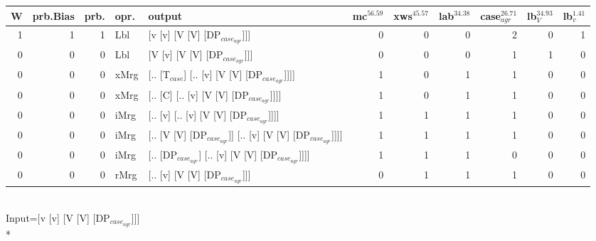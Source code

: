 \begin{tabularx}{\linewidth}{rrrlXrrrrrr}
\hline
   W &   prb.Bias &   prb. & opr.   & output                                                    &   mc$^{56.59}$ &   xws$^{45.57}$ &   lab$^{34.38}$ &   case$_{agr}^{26.71}$ &   lb$_{V}^{34.93}$ &   lb$_{v}^{1.41}$ \\
\hline
   1 &       1 &   1 & Lbl  & [v [v] [V [V] [DP$_{case_{agr}}$]]]                             &            0 &             0 &             0 &                  2 &              0 &             1 \\
   0 &       0 &   0 & Lbl  & [V [v] [V [V] [DP$_{case_{agr}}$]]]                             &            0 &             0 &             0 &                  1 &              1 &             0 \\
   0 &       0 &   0 & xMrg & [.. [T$_{case}$] [.. [v] [V [V] [DP$_{case_{agr}}$]]]]              &            1 &             0 &             1 &                  1 &              0 &             0 \\
   0 &       0 &   0 & xMrg & [.. [C] [.. [v] [V [V] [DP$_{case_{agr}}$]]]]                   &            1 &             0 &             1 &                  1 &              0 &             0 \\
   0 &       0 &   0 & iMrg & [.. [v] [.. [v] [V [V] [DP$_{case_{agr}}$]]]]                   &            1 &             1 &             1 &                  1 &              0 &             0 \\
   0 &       0 &   0 & iMrg & [.. [V [V] [DP$_{case_{agr}}$]] [.. [v] [V [V] [DP$_{case_{agr}}$]]]] &            1 &             1 &             1 &                  1 &              0 &             0 \\
   0 &       0 &   0 & iMrg & [.. [DP$_{case_{agr}}$] [.. [v] [V [V] [DP$_{case_{agr}}$]]]]         &            1 &             1 &             1 &                  0 &              0 &             0 \\
   0 &       0 &   0 & rMrg & [.. [v] [V [V] [DP$_{case_{agr}}$]]]                            &            0 &             1 &             1 &                  1 &              0 &             0 \\
\hline
\end{tabularx}\endgroup\\
\begingroup\scriptsize Input=[v [v] [V [V] [DP$_{case_{agr}}$]]]\\*

